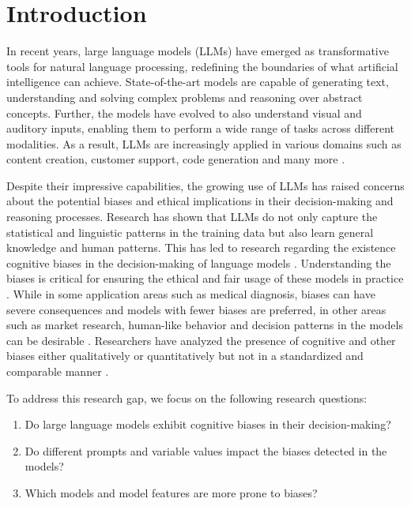 \section{Introduction}
\par In recent years, large language models (LLMs) have emerged as transformative tools for natural language processing, redefining the boundaries of what artificial intelligence can achieve. State-of-the-art models are capable of generating text, understanding and solving complex problems and reasoning over abstract concepts. Further, the models have evolved to also understand visual and auditory inputs, enabling them to perform a wide range of tasks across different modalities. As a result, LLMs are increasingly applied in various domains such as content creation, customer support, code generation and many more \parencite{hadi2024large, naveed2023comprehensive, zhao2023survey}.

\par Despite their impressive capabilities, the growing use of LLMs has raised concerns about the potential biases and ethical implications in their decision-making and reasoning processes. Research has shown that LLMs do not only capture the statistical and linguistic patterns in the training data but also learn general knowledge and human patterns. This has led to research regarding the existence cognitive biases in the decision-making of language models \parencite{schramowski2022large}. Understanding the biases is critical for ensuring the ethical and fair usage of these models in practice \parencite{echterhoff2024cognitive}. While in some application areas such as medical diagnosis, biases can have severe consequences and models with fewer biases are preferred, in other areas such as market research, human-like behavior and decision patterns in the models can be desirable \parencite{talboy2023challenging}. Researchers have analyzed the presence of cognitive and other biases either qualitatively or quantitatively but not in a standardized and comparable manner \parencite{dominguez2023questioning,echterhoff2024cognitive,talboy2023challenging}.

\par To address this research gap, we focus on the following research questions:
\begin{enumerate}[itemsep=0pt, parsep=0pt, topsep=0pt]
    \item Do large language models exhibit cognitive biases in their decision-making?
    \item Do different prompts and variable values impact the biases detected in the models?
    \item Which models and model features are more prone to biases?
\end{enumerate}

